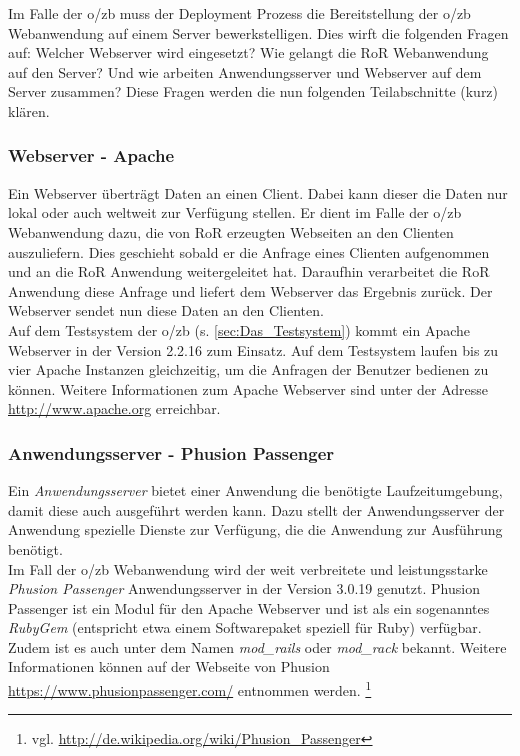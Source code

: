 \documentclass[12pt,             %
               a4paper,          %
               listof=totoc,     %
               index=totoc,      %
               bibliography=totoc,%
               oneside,         %
               BCOR1cm,          %
               english   %
               ]{scrbook}
\begin{document}
Im Falle der o/zb muss der Deployment Prozess die Bereitstellung der o/zb Webanwendung auf einem Server bewerkstelligen. Dies wirft die folgenden Fragen auf: Welcher Webserver wird eingesetzt? Wie gelangt die RoR Webanwendung auf den Server? Und wie arbeiten Anwendungsserver und Webserver auf dem Server zusammen? Diese Fragen werden die nun folgenden Teilabschnitte (kurz) klären.

\subsubsection{Webserver - Apache}
Ein Webserver überträgt Daten an einen Client. Dabei kann dieser die Daten nur lokal oder auch weltweit zur Verfügung stellen. Er dient im Falle der o/zb Webanwendung dazu, die von RoR erzeugten Webseiten an den Clienten auszuliefern. Dies geschieht sobald er die Anfrage eines Clienten aufgenommen und an die RoR Anwendung weitergeleitet hat. Daraufhin verarbeitet die RoR Anwendung diese Anfrage und liefert dem Webserver das Ergebnis zurück. Der Webserver sendet nun diese Daten an den Clienten.\\

Auf dem Testsystem der o/zb (s. \vref{sec:Das_Testsystem}) kommt ein Apache Webserver in der Version 2.2.16 zum Einsatz. Auf dem Testsystem laufen bis zu vier Apache Instanzen gleichzeitig, um die Anfragen der Benutzer bedienen zu können. Weitere Informationen zum Apache Webserver sind unter der Adresse \url{http://www.apache.org} erreichbar.

\subsubsection{Anwendungsserver - Phusion Passenger}
Ein \textit{Anwendungsserver} bietet einer Anwendung die benötigte Laufzeitumgebung, damit diese auch ausgeführt werden kann. Dazu stellt der Anwendungsserver der Anwendung spezielle Dienste zur Verfügung, die die Anwendung zur Ausführung benötigt.\\
Im Fall der o/zb Webanwendung wird der weit verbreitete und leistungsstarke \textit{Phusion Passenger} Anwendungsserver in der Version 3.0.19 genutzt. Phusion Passenger ist ein Modul für den Apache Webserver und ist als ein sogenanntes \textit{RubyGem} (entspricht etwa einem Softwarepaket speziell für Ruby) verfügbar. Zudem ist es auch unter dem Namen \textit{mod\_rails} oder \textit{mod\_rack} bekannt. Weitere Informationen können auf der Webseite von Phusion \url{https://www.phusionpassenger.com/} entnommen werden. \footnote{vgl. \url{http://de.wikipedia.org/wiki/Phusion_Passenger}}
\end{document}
